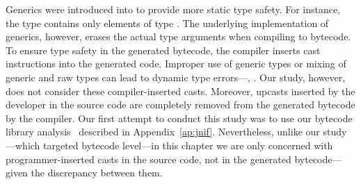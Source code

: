 Generics were introduced into \java{} to provide more static type safety.
For instance, the type  contains only elements of type .
The underlying implementation of generics, however,
erases the actual type arguments when compiling to bytecode.
To ensure type safety in the generated bytecode,
the compiler inserts cast instructions into the generated code.
Improper use of generic types or mixing of generic and raw types can lead
to dynamic type errors---\ie, .
Our study, however, does not consider these compiler-inserted casts.
Moreover, upcasts inserted by the developer in the source code are completely removed from the generated bytecode by the compiler.
Our first attempt to conduct this study was to use our bytecode library
analysis~\citep{mastrangeloJNIFJavaNative2014} described in Appendix~\ref{ap:jnif}.
Nevertheless, unlike our \unsafe{} study---which targeted \java{} bytecode level---in this chapter we are only concerned with programmer-inserted casts in the source code,
not in the generated bytecode---given the discrepancy between them.
